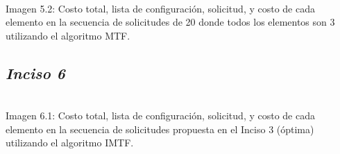 \begin{center}
\\
\vspace{0.02in}
\small\textcolor{FSBlue}{Imagen 5.2: Costo total, lista de configuración, solicitud, y costo de cada elemento en la secuencia de solicitudes de 20 donde todos los elementos son 3 utilizando el algoritmo MTF.}
\end{center}

\subsection*{\textit{\textbf{Inciso 6}}}

\begin{center}
\\
\vspace{0.02in}
\small\textcolor{FSBlue}{Imagen 6.1: Costo total, lista de configuración, solicitud, y costo de cada elemento en la secuencia de solicitudes propuesta en el Inciso 3 (óptima) utilizando el algoritmo IMTF.}
\end{center}

